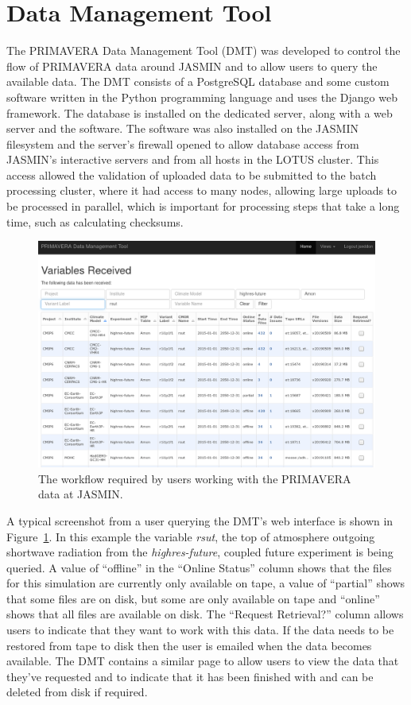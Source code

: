 \documentclass[gmd, manuscript]{copernicus}
\begin{document}
\section{Data Management Tool}

The PRIMAVERA Data Management Tool (DMT) was developed to control the flow of PRIMAVERA data around JASMIN and to allow users to query the available data. The DMT consists of a PostgreSQL database and some custom software written in the Python programming language and uses the Django web framework. The database is installed on the dedicated server, along with a web server and the software. The software was also installed on the JASMIN filesystem and the server's firewall opened to allow database access from JASMIN's interactive servers and from all hosts in the LOTUS cluster. This access allowed the validation of uploaded data to be submitted to the batch processing cluster, where it had access to many nodes, allowing large uploads to be processed in parallel, which is important for processing steps that take a long time, such as calculating checksums.

\begin{figure}[t]
	\includegraphics[width=12cm]{dmt_query.png}
	\caption{The workflow required by users working with the PRIMAVERA data at JASMIN.}
	\label{dmt_query}
\end{figure}

A typical screenshot from a user querying the DMT's web interface is shown in Figure~\ref{dmt_query}. In this example the variable \textit{rsut}, the top of atmosphere outgoing shortwave radiation from the \textit{highres-future}, coupled future experiment is being queried. A value of ``offline'' in the ``Online Status'' column shows that the files for this simulation are currently only available on tape, a value of ``partial'' shows that some files are on disk, but some are only available on tape and ``online'' shows that all files are available on disk. The ``Request Retrieval?'' column allows users to indicate that they want to work with this data. If the data needs to be restored from tape to disk then the user is emailed when the data becomes available. The DMT contains a similar page to allow users to view the data that they've requested and to indicate that it has been finished with and can be deleted from disk if required.
\end{document}

